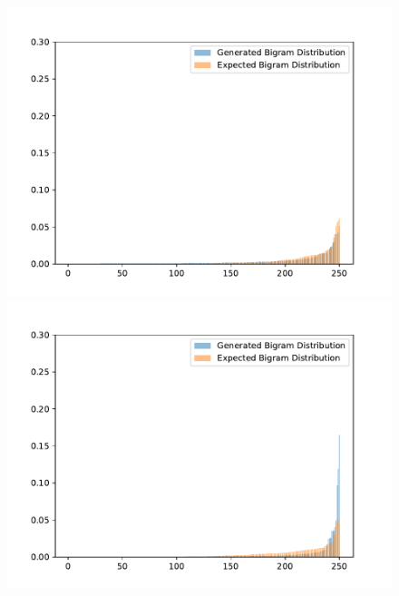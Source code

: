 \begin{figure}[H]
	\includegraphics[width=\linewidth]{img/plots/opensubtitles_not_reversed/bigram_distribution_comparison_step_500000.pdf}
	\centering
	\small
	\endminipage\hfill
	\includegraphics[width=\linewidth]{img/plots/opensubtitles_not_reversed/bigram_distribution_comparison_step_1000000.pdf}
	\centering
	\small
	\endminipage\hfill

\end{figure}
